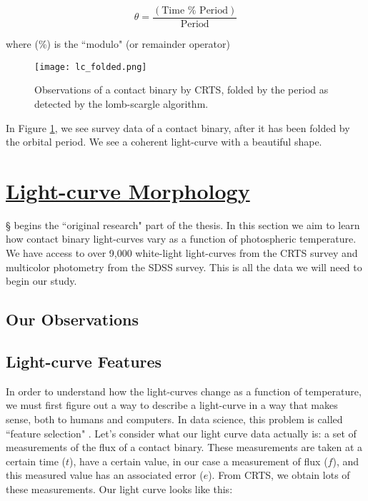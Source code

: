 \documentclass[12pt]{article} %
\numberwithin{equation}{section} %
\begin{document}
\begin{equation} \label{phase_fold}
\theta = \frac{(\text{Time } \% \text{ Period})}{\text{Period}}
\end{equation}

where (\%) is the ``modulo" (or remainder operator)

\begin{figure}[H]
\centering
\texttt{[image: lc\_folded.png]}
\caption{Observations of a contact binary by CRTS, folded by the period as detected by the lomb-scargle algorithm.}
\label{fig: lc_folded}
\end{figure}

In Figure \ref{fig: lc_folded}, we see survey data of a contact binary, after it has been folded by the orbital period. We see a coherent light-curve with a beautiful shape.


\section[Light-curve Morphology]{\hyperlink{toc}{Light-curve Morphology}} \label{sec: lc_morph}

\S\label{sec: lc_morph} begins the ``original research" part of the thesis. In this section we aim to learn how contact binary light-curves vary as a function of photospheric temperature. We have access to over 9,000 white-light light-curves from the CRTS survey and multicolor photometry from the SDSS survey. This is all the data we will need to begin our study.

\subsection[Our Observations]{Our Observations} \label{sec: Our Observations}

\subsection[Light-curve Features]{Light-curve Features} \label{sec: Light-curve Features}

In order to understand how the light-curves change as a function of temperature, we must first figure out a way to describe a light-curve in a way that makes sense, both to humans and computers. In data science, this problem is called ``feature selection" . Let's consider what our light curve data actually is: a set of measurements of the flux of a contact binary. These measurements are taken at a certain time ($t$), have a certain value, in our case a measurement of flux ($f$), and this measured value has an associated error ($e$). From CRTS, we obtain lots of these measurements. Our light curve looks like this:
\end{document}
